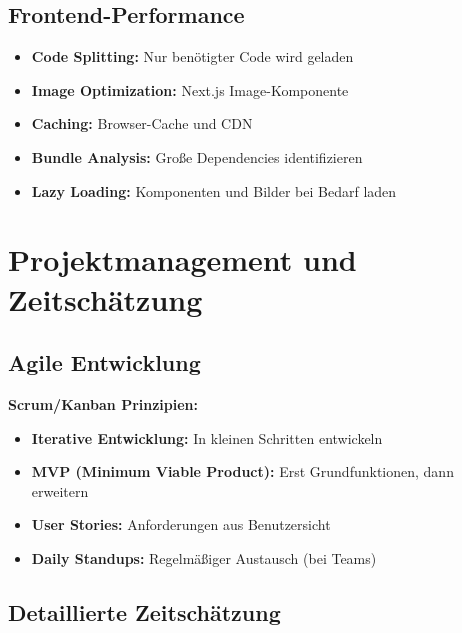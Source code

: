 \documentclass[a4paper,12pt]{article}
\begin{document}
\subsection{Frontend-Performance}

\begin{itemize}
    \item \textbf{Code Splitting:} Nur benötigter Code wird geladen
    \item \textbf{Image Optimization:} Next.js Image-Komponente
    \item \textbf{Caching:} Browser-Cache und CDN
    \item \textbf{Bundle Analysis:} Große Dependencies identifizieren
    \item \textbf{Lazy Loading:} Komponenten und Bilder bei Bedarf laden
\end{itemize}

\section{Projektmanagement und Zeitschätzung}

\subsection{Agile Entwicklung}

\textbf{Scrum/Kanban Prinzipien:}
\begin{itemize}
    \item \textbf{Iterative Entwicklung:} In kleinen Schritten entwickeln
    \item \textbf{MVP (Minimum Viable Product):} Erst Grundfunktionen, dann erweitern
    \item \textbf{User Stories:} Anforderungen aus Benutzersicht
    \item \textbf{Daily Standups:} Regelmäßiger Austausch (bei Teams)
\end{itemize}

\subsection{Detaillierte Zeitschätzung}
\end{document}
